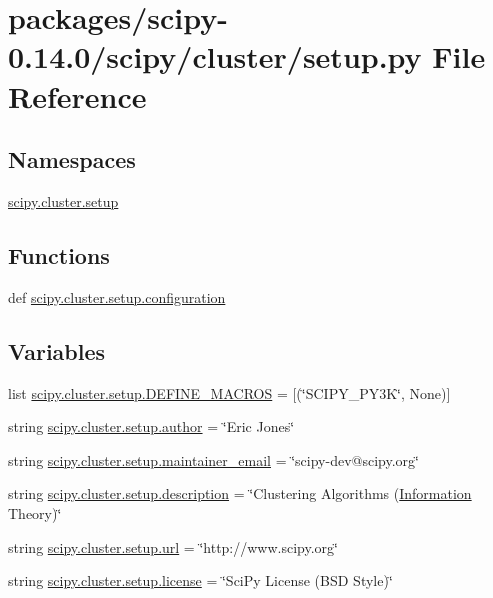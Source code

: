 \hypertarget{packages_2scipy-0_814_80_2scipy_2cluster_2setup_8py}{}\section{packages/scipy-\/0.14.0/scipy/cluster/setup.py File Reference}
\label{packages_2scipy-0_814_80_2scipy_2cluster_2setup_8py}
\subsection*{Namespaces}
\begin{DoxyCompactItemize}
\item 
 \hyperlink{namespacescipy_1_1cluster_1_1setup}{scipy.\+cluster.\+setup}
\end{DoxyCompactItemize}
\subsection*{Functions}
\begin{DoxyCompactItemize}
\item 
def \hyperlink{namespacescipy_1_1cluster_1_1setup_a9a4036494fd2cb2f8a33087b13f538d1}{scipy.\+cluster.\+setup.\+configuration}
\end{DoxyCompactItemize}
\subsection*{Variables}
\begin{DoxyCompactItemize}
\item 
list \hyperlink{namespacescipy_1_1cluster_1_1setup_a49d3aea3fdae8f53218699cf2ef09892}{scipy.\+cluster.\+setup.\+D\+E\+F\+I\+N\+E\+\_\+\+M\+A\+C\+R\+O\+S} = \mbox{[}(\char`\"{}S\+C\+I\+P\+Y\+\_\+\+P\+Y3\+K\char`\"{}, None)\mbox{]}
\item 
string \hyperlink{namespacescipy_1_1cluster_1_1setup_a33bb7384cc6e48f12d23573fd45709e3}{scipy.\+cluster.\+setup.\+author} = \char`\"{}Eric Jones\char`\"{}
\item 
string \hyperlink{namespacescipy_1_1cluster_1_1setup_a34dd09f4e5cb0046db41763ae69caab2}{scipy.\+cluster.\+setup.\+maintainer\+\_\+email} = \char`\"{}scipy-\/dev@scipy.\+org\char`\"{}
\item 
string \hyperlink{namespacescipy_1_1cluster_1_1setup_afbe9aabb851c1560329f84cb7e4d6c08}{scipy.\+cluster.\+setup.\+description} = \char`\"{}Clustering Algorithms (\hyperlink{sparse_2linalg_2eigen_2arpack_2ARPACK_2SRC_2stat_8h_a67091df4e8abc54c6f3c19ef79b555f0}{Information} Theory)\char`\"{}
\item 
string \hyperlink{namespacescipy_1_1cluster_1_1setup_ad1dc45c1949a63588a6ed87705caf00f}{scipy.\+cluster.\+setup.\+url} = \char`\"{}http\+://www.\+scipy.\+org\char`\"{}
\item 
string \hyperlink{namespacescipy_1_1cluster_1_1setup_a7178ce4c13b952f048081ada27247ba4}{scipy.\+cluster.\+setup.\+license} = \char`\"{}Sci\+Py License (B\+S\+D Style)\char`\"{}
\end{DoxyCompactItemize}

